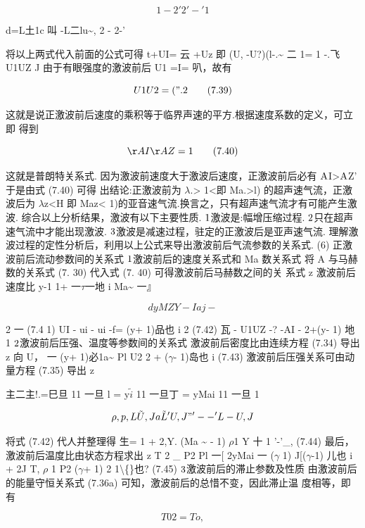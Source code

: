 \[1 - 2' 2 '-'1\]

d=L土1c 叫 -L二lu\textasciitilde{}, 2 - 2-'

将以上两式代入前面的公式可得 t+UI= 云 +Uz 即 (U, -U?)(l-.\textasciitilde{} 二 1= 1 -.飞 U1UZ J 由于有眼强度的激波前后 U1 =I= 叭，故有

\begin{equation*}U1U2 = (".2\tag{7.39}\end{equation*}

这就是说正激波前后速度的乘积等于临界声速的平方.根据速度系数的定义，可立即 得到

\begin{equation*}\AA I\AA Z = 1\tag{7.40}\end{equation*}

这就是普朗特关系式. 因为激波前速度大于激波后速度，正激波前后必有 ${\rm A}$I>${\rm A}$Z' 于是由式 (7.40) 可得 出结论:正激波前为 $\lambda$.> 1<即 Ma.>l) 的超声速气流，正激波后为 $\lambda$z<H 即 Maz< 1)的亚音速气流.换言之，只有超声速气流才有可能产生激波. 综合以上分析结果，激波有以下主要性质. ${\rm 1}$激波是:幅增压缩过程. ${\rm 2}$只在超声速气流中才能出现激波. ${\rm 3}$激波是减速过程，驻定的正激波后是亚声速气流. 理解激波过程的定性分析后，利用以上公式来导出激波前后气流参数的关系式. (6) 正激波前后流动参数间的关系式 ${\rm 1}$激波前后的速度关系式和 Ma 数关系式 将 A 与马赫数的关系式 (7. 30) 代入式 (7. 40) 可得激波前后马赫数之间的关 系式 z 激波前后速度比 y-1 1+ 一$\tau$一地 i Ma\textasciitilde{} 一』

\[dyM Z Y-I a j -\]

2 一 (7.4 1) UI - ui - ui -f= (y+ 1)品也 i 2 (7.42) 瓦 - U1UZ -? -AI - 2+(y- 1) 地 1 ${\rm 2}$激波前后压强、温度等参数间的关系式 激波前后密度比由连续方程 (7.34) 导出 z 向 U， 一 (y+ 1)必1a\textasciitilde{} Pl U2 2 + ($\gamma$- 1)岛也 i (7.43) 激波前后压强关系可由动量方程 (7.35) 导出 z

主二主!.=巳旦 11 一旦 l = y$\tilde{i}$ 11 一旦丁 = yMai 11 一旦 1

\[\rho  ,  p, L\tilde{U} ,J a\tilde{L}' U ,J "'--'L- U ,J\]

将式 (7.42) 代人并整理得 生= 1 + 2,Y. (Ma \textasciitilde{} - 1) $\rho$1 Y 十 1 '-'\_, (7.44) 最后，激波前后温度比由状态方程求出 z T 2 \_ P2 Pl 一[ 2yMai 一 ($\gamma$ 1) J[($\gamma$-1) 儿也 i + 2J T, $\rho$ 1 P2 ($\gamma$+ 1) 2 1\textbackslash\{\}也? (7.45) ${\rm 3}$激波前后的滞止参数及性质 由激波前后的能量守恒关系式 (7.36a) 可知，激波前后的总惜不变，因此滞止温 度相等，即有

\begin{equation*}T 02 = T o,\tag{7.46}\end{equation*}

